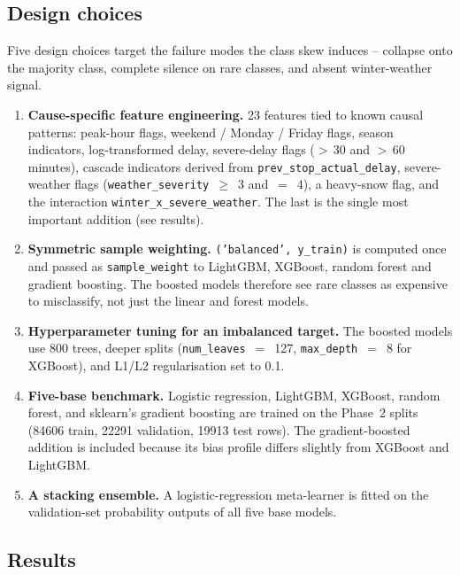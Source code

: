 \subsection{Design choices}

Five design choices target the failure modes the class skew induces -- collapse onto the majority class, complete silence on rare classes, and absent winter-weather signal.

\begin{enumerate}
    \item \textbf{Cause-specific feature engineering.} 23 features tied to known causal patterns: peak-hour flags, weekend / Monday / Friday flags, season indicators, log-transformed delay, severe-delay flags ($>$\,30 and $>$\,60 minutes), cascade indicators derived from \texttt{prev\_stop\_actual\_delay}, severe-weather flags (\texttt{weather\_severity}~$\geq$~3 and~$=$~4), a heavy-snow flag, and the interaction \texttt{winter\_x\_severe\_weather}. The last is the single most important addition (see results).
    \item \textbf{Symmetric sample weighting.} \texttt{}\linebreak[2]\texttt{('balanced',\ y\_train)} is computed once and passed as \texttt{sample\_weight} to LightGBM, XGBoost, random forest and gradient boosting. The boosted models therefore see rare classes as expensive to misclassify, not just the linear and forest models.
    \item \textbf{Hyperparameter tuning for an imbalanced target.} The boosted models use 800 trees, deeper splits (\texttt{num\_leaves}~$=$~127, \texttt{max\_depth}~$=$~8 for XGBoost), and L1/L2 regularisation set to \num{0.1}.
    \item \textbf{Five-base benchmark.} Logistic regression, LightGBM, XGBoost, random forest, and sklearn's gradient boosting are trained on the Phase~2 splits (\num{84606} train, \num{22291} validation, \num{19913} test rows). The gradient-boosted addition is included because its bias profile differs slightly from XGBoost and LightGBM.
    \item \textbf{A stacking ensemble.} A logistic-regression meta-learner is fitted on the validation-set probability outputs of all five base models.
\end{enumerate}

\subsection{Results}

